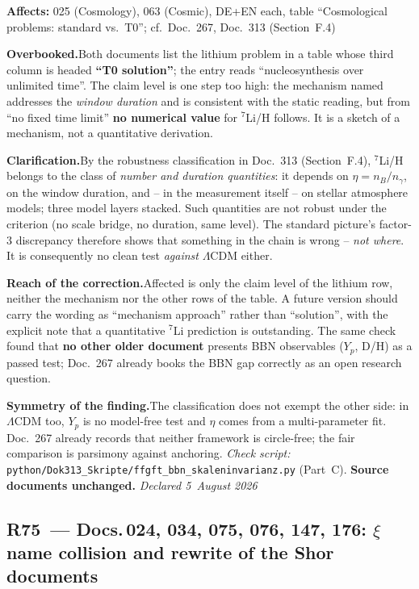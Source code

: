 \noindent\textbf{Affects:} 025 (Cosmology), 063 (Cosmic), DE+EN each,
table \enquote{Cosmological problems: standard vs.\ T0}; cf.\
Doc.~267, Doc.~313 (Section~F.4)

\smallskip\noindent\textbf{Overbooked.}\quad Both documents list the
lithium problem in a table whose third column is headed
\textbf{\enquote{T0 solution}}; the entry reads
\enquote{nucleosynthesis over unlimited time}. The claim level is one
step too high: the mechanism named addresses the \emph{window
duration} and is consistent with the static reading, but from
\enquote{no fixed time limit} \textbf{no numerical value} for
$^{7}$Li/H follows. It is a sketch of a mechanism, not a quantitative
derivation.

\smallskip\noindent\textbf{Clarification.}\quad By the robustness
classification in Doc.~313 (Section~F.4), $^{7}$Li/H belongs to the
class of \emph{number and duration quantities}: it depends on
$\eta = n_B/n_\gamma$, on the window duration, and -- in the
measurement itself -- on stellar atmosphere models; three model layers
stacked. Such quantities are not robust under the criterion (no scale
bridge, no duration, same level). The standard picture's
factor-$3$ discrepancy therefore shows that something in the chain is
wrong -- \emph{not where}. It is consequently no clean test
\emph{against} $\Lambda$CDM either.

\smallskip\noindent\textbf{Reach of the correction.}\quad Affected is
only the claim level of the lithium row, neither the mechanism nor the
other rows of the table. A future version should carry the wording as
\enquote{mechanism approach} rather than \enquote{solution}, with the
explicit note that a quantitative $^{7}$Li prediction is outstanding.
The same check found that \textbf{no other older document} presents
BBN observables ($Y_p$, D/H) as a passed test; Doc.~267 already books
the BBN gap correctly as an open research question.

\smallskip\noindent\textbf{Symmetry of the finding.}\quad The
classification does not exempt the other side: in $\Lambda$CDM too,
$Y_p$ is no model-free test and $\eta$ comes from a multi-parameter
fit. Doc.~267 already records that neither framework is circle-free;
the fair comparison is parsimony against anchoring. \emph{Check
script:}
\texttt{python/Dok313\_Skripte/ffgft\_bbn\_skaleninvarianz.py}
(Part~C). \textbf{Source documents unchanged.}
\emph{Declared 5~August 2026}

\subsection*{R75~--- Docs.\,024, 034, 075, 076, 147, 176: $\xi$ name
collision and rewrite of the Shor documents}

